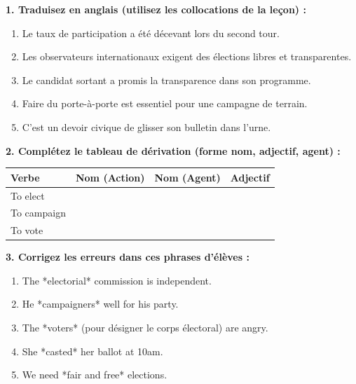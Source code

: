 \documentclass[11pt]{article}
\begin{document}
\begin{exercice}
\textbf{1. Traduisez en anglais (utilisez les collocations de la leçon) :}
\begin{enumerate}
    \item Le taux de participation a été décevant lors du second tour.
    \item Les observateurs internationaux exigent des élections libres et transparentes.
    \item Le candidat sortant a promis la transparence dans son programme.
    \item Faire du porte-à-porte est essentiel pour une campagne de terrain.
    \item C'est un devoir civique de glisser son bulletin dans l'urne.
\end{enumerate}
\textbf{2. Complétez le tableau de dérivation (forme nom, adjectif, agent) :}
\begin{center}
\begin{tabular}{|l|c|c|c|}
\hline
\rowcolor{popblueL} Verbe & Nom (Action) & Nom (Agent) & Adjectif \\
\hline
To elect & & & \\
\hline
To campaign & & & \\
\hline
To vote & & & \\
\hline
\end{tabular}
\end{center}
\textbf{3. Corrigez les erreurs dans ces phrases d'élèves :}
\begin{enumerate}
    \item The *electorial* commission is independent.
    \item He *campaigners* well for his party.
    \item The *voters* (pour désigner le corps électoral) are angry.
    \item She *casted* her ballot at 10am.
    \item We need *fair and free* elections.
\end{enumerate}
\end{exercice}
\end{document}
